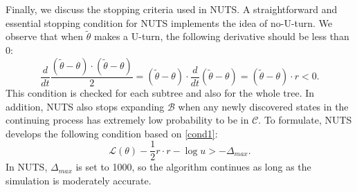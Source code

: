 \documentclass{article}
\begin{document}
\par Finally, we discuss the stopping criteria used in NUTS. A straightforward and essential stopping condition for NUTS implements the idea of no-U-turn. We observe that when $\tilde{\theta}$ makes a U-turn, the following derivative
should be less than 0:
\begin{equation}
\frac{d}{dt}\frac{(\tilde{\theta}-\theta)\cdot (\tilde{\theta}-\theta)}{2} = (\tilde{\theta}-\theta)\cdot\frac{d}{dt}(\tilde{\theta}-\theta)= (\tilde{\theta}-\theta)\cdot r < 0.
\label{cond2} \tag{C.2}
\end{equation}
%
This condition is checked for each subtree and also for the whole tree. %
In addition, NUTS also stops expanding $\mathcal{B}$ when any newly discovered states in the continuing process has extremely low probability to be in $\mathcal{C}$. To formulate, NUTS develops the following condition based on \eqref{cond1}:
\begin{equation}
\mathcal{L}(\theta) -\frac{1}{2}r\cdot r -\log u > -\Delta_{max}.
\label{cond3} \tag{C.3}
\end{equation}
\noindent In NUTS, $\Delta_{max}$ is set to 1000, so the algorithm continues as long as the simulation is moderately accurate.
\end{document}
